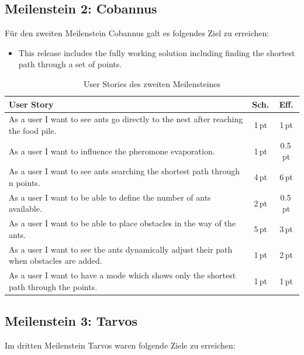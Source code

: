 \subsection{Meilenstein 2: Cobannus}


Für den zweiten Meilenstein Cobannus galt es folgendes Ziel zu erreichen:

\begin{itemize}[noitemsep]
\item This release includes the fully working solution including finding the shortest path through a set of points.
\end{itemize}

\begin{table}[H]
\small\sffamily\renewcommand{\arraystretch}{1.5}
\begin{tabular}{| p{12cm} | c | c |}
  \hline
  \bfseries{User Story} & \bfseries{Sch.} & \bfseries{Eff.}  \\
  \hline
  As a user I want to see ants go directly to the nest after reaching the food pile. & 1\,pt & 1\,pt \\
  \hline
  As a user I want to influence the pheromone evaporation. & 1\,pt & 0.5\,pt \\
  \hline
  As a user I want to see ants searching the shortest path through n points. & 4\,pt & 6\,pt \\
  \hline
  As a user I want to be able to define the number of ants available. & 2\,pt & 0.5\,pt \\
  \hline
  As a user I want to be able to place obstacles in the way of the ants. & 5\,pt & 3\,pt \\
  \hline
  As a user I want to see the ants dynamically adjust their path when obstacles are added. & 1\,pt & 2\,pt \\
  \hline
  As a user I want to have a mode which shows only the shortest path through the points. & 1\,pt & 1\,pt \\
  \hline
\end{tabular}
\caption{User Stories des zweiten Meilensteines}
\end{table}

\vspace*{0.5cm}

\subsection{Meilenstein 3: Tarvos}

Im dritten Meilenstein Tarvos waren folgende Ziele zu erreichen:


